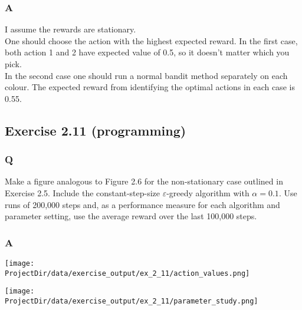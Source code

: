 \subsubsection{A}
I assume the rewards are stationary.\\

One should choose the action with the highest expected reward. In the first case, both action 1 and 2 have expected value of 0.5, so it doesn't matter which you pick.\\

In the second case one should run a normal bandit method separately on each colour. The expected reward from identifying the optimal actions in each case is 0.55.

\subsection{Exercise 2.11 (programming)}
\subsubsection{Q}
Make a figure analogous to Figure 2.6 for the non-stationary case outlined in Exercise 2.5. Include the constant-step-size $\varepsilon$-greedy algorithm with $\alpha=0.1$. Use runs of 200,000 steps and, as a performance measure for each algorithm and parameter setting, use the average reward over the last 100,000 steps.

\subsubsection{A}
\ProgrammingExercise

\texttt{[image: \\ProjectDir/data/exercise\_output/ex\_2\_11/action\_values.png]}

\texttt{[image: \\ProjectDir/data/exercise\_output/ex\_2\_11/parameter\_study.png]}


